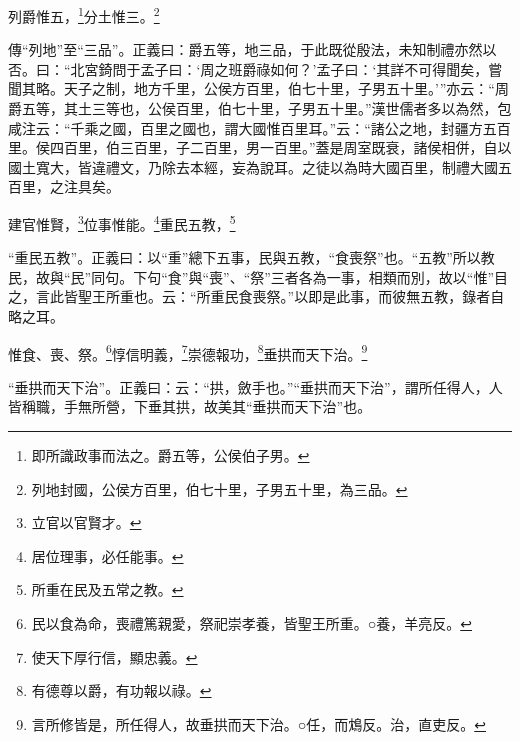 列爵惟五，\footnote{即所識政事而法之。爵五等，公侯伯子男。}分土惟三。\footnote{列地封國，公侯方百里，伯七十里，子男五十里，為三品。}

{\noindent\zhuan{}\fzbyks 傳“列地”至“三品”。正義曰：爵五等，地三品，于此既從殷法，未知制禮亦然以否。曰：“北宮錡問于孟子曰：‘周之班爵祿如何？’孟子曰：‘其詳不可得聞矣，嘗聞其略。天子之制，地方千里，公侯方百里，伯七十里，子男五十里。’”亦云：“周爵五等，其土三等也，公侯百里，伯七十里，子男五十里。”漢世儒者多以為然，包咸注云：“千乘之國，百里之國也，謂大國惟百里耳。”云：“諸公之地，封疆方五百里。侯四百里，伯三百里，子二百里，男一百里。”蓋是周室既衰，諸侯相併，自以國土寬大，皆違禮文，乃除去本經，妄為說耳。之徒以為時大國百里，制禮大國五百里，之注具矣。 \par}

建官惟賢，\footnote{立官以官賢才。}位事惟能。\footnote{居位理事，必任能事。}重民五教，\footnote{所重在民及五常之教。}

{\noindent\shu{}\fzkt “重民五教”。正義曰：以“重”總下五事，民與五教，“食喪祭”也。“五教”所以教民，故與“民”同句。下句“食”與“喪”、“祭”三者各為一事，相類而別，故以“惟”目之，言此皆聖王所重也。云：“所重民食喪祭。”以即是此事，而彼無五教，錄者自略之耳。 \par}

惟食、喪、祭。\footnote{民以食為命，喪禮篤親愛，祭祀崇孝養，皆聖王所重。○養，羊亮反。}惇信明義，\footnote{使天下厚行信，顯忠義。}崇德報功，\footnote{有德尊以爵，有功報以祿。}垂拱而天下治。\footnote{言所修皆是，所任得人，故垂拱而天下治。○任，而鴆反。治，直吏反。}

{\noindent\shu{}\fzkt “垂拱而天下治”。正義曰：云：“拱，斂手也。”“垂拱而天下治”，謂所任得人，人皆稱職，手無所營，下垂其拱，故美其“垂拱而天下治”也。 \par}

